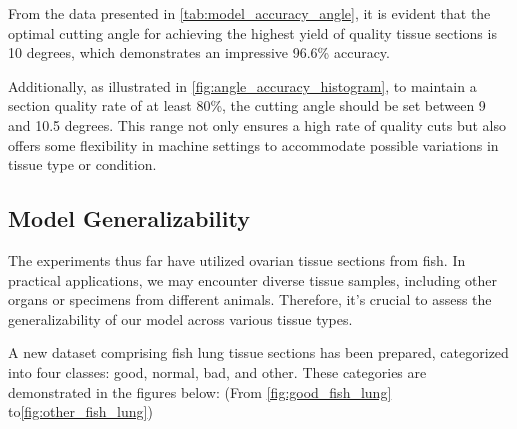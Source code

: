 From the data presented in \autoref{tab:model_accuracy_angle}, it is evident that the optimal cutting angle for achieving the highest yield of quality tissue sections is 10 degrees, which demonstrates an impressive 96.6\% accuracy.

Additionally, as illustrated in \autoref{fig:angle_accuracy_histogram}, to maintain a section quality rate of at least 80\%, the cutting angle should be set between 9 and 10.5 degrees. This range not only ensures a high rate of quality cuts but also offers some flexibility in machine settings to accommodate possible variations in tissue type or condition.


\subsection{Model Generalizability}

The experiments thus far have utilized ovarian tissue sections from fish. In practical applications, we may encounter diverse tissue samples, including other organs or specimens from different animals. Therefore, it's crucial to assess the generalizability of our model across various tissue types.

A new dataset comprising fish lung tissue sections has been prepared, categorized into four classes: good, normal, bad, and other. These categories are demonstrated in the figures below:
(From \autoref{fig:good_fish_lung} to\autoref{fig:other_fish_lung})


